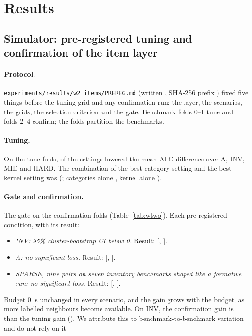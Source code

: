 \documentclass{article}
\begin{document}
\section{Results}
\label{sec:results}

\subsection{Simulator: pre-registered tuning and confirmation of the item layer}
\label{sec:sim}

\paragraph{Protocol.} \texttt{experiments/results/w2\_items/PREREG.md} (written \WpTime, SHA-256 prefix \texttt{\WpSha}) fixed five things before the tuning grid and any confirmation run: the layer, the scenarios, the grids, the selection criterion and the gate. Benchmark folds 0--1 tune and folds 2--4 confirm; the folds partition the benchmarks.

\paragraph{Tuning.} On the tune folds, \WtNNeg{} of the \WtNSettings{} settings lowered the mean ALC difference over A, INV, MID and HARD. The combination of the best category setting and the best kernel setting was \WtSelectedIsBest{} (\WtCrit; categories alone \WtCritF, kernel alone \WtCritK).

\paragraph{Gate and confirmation.} The gate \WcGate{} on the confirmation folds (Table~\ref{tab:wtwo}). Each pre-registered condition, with its result:
\begin{itemize}
\item[(a)] \emph{INV: 95\% cluster-bootstrap CI below 0.} Result: \WcInvMean{} [\WcInvLo, \WcInvHi].
\item[(b)] \emph{A: no significant loss.} Result: \WcAMean{} [\WcALo, \WcAHi].
\item[(c)] \emph{SPARSE, nine pairs on seven inventory benchmarks shaped like a formative run: no significant loss.} Result: \WcSparseMean{} [\WcSparseLo, \WcSparseHi].
\end{itemize}
Budget 0 is unchanged in every scenario, and the gain grows with the budget, as more labelled neighbours become available. On INV, the confirmation gain is \WcConfirmVsTune{} than the tuning gain (\WtTuneInv). We attribute this to benchmark-to-benchmark variation and do not rely on it.
\end{document}
